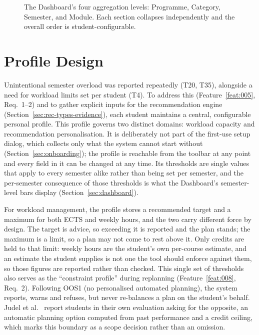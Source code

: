 \begin{figure}[htbp]
\caption{The Dashboard's four aggregation levels: Programme, Category, Semester, and Module. Each section collapses independently and the overall order is student-configurable.}
\label{fig:dashboard-levels}
\end{figure}

\section{Profile Design}
\label{sec:profile}
Unintentional semester overload was reported repeatedly (T20, T35), alongside a need for workload limits set per student (T4). To address this (Feature~\ref{feat:005}, Req.~1--2) and to gather explicit inputs for the recommendation engine (Section~\ref{sec:rec-types-evidence}), each student maintains a central, configurable personal profile. This profile governs two distinct domains: workload capacity and recommendation personalisation. It is deliberately not part of the first-use setup dialog, which collects only what the system cannot start without (Section~\ref{sec:onboarding}); the profile is reachable from the toolbar at any point and every field in it can be changed at any time. Its thresholds are single values that apply to every semester alike rather than being set per semester, and the per-semester consequence of those thresholds is what the Dashboard's semester-level bars display (Section~\ref{sec:dashboard}).

For workload management, the profile stores a recommended target and a maximum for both ECTS and weekly hours, and the two carry different force by design. The target is advice, so exceeding it is reported and the plan stands; the maximum is a limit, so a plan may not come to rest above it. Only credits are held to that limit: weekly hours are the student's own per-course estimate, and an estimate the student supplies is not one the tool should enforce against them, so those figures are reported rather than checked. This single set of thresholds also serves as the \enquote{constraint profile} during replanning (Feature~\ref{feat:008}, Req.~2). Following OOS1 (no personalised automated planning), the system reports, warns and refuses, but never re-balances a plan on the student's behalf. Judel et al.~\cite{judel_supporting_2023} report students in their own evaluation asking for the opposite, an automatic planning option computed from past performance and a credit ceiling, which marks this boundary as a scope decision rather than an omission.

